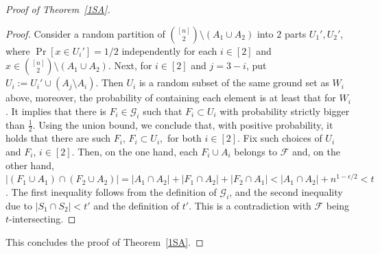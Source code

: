 \documentclass[10pt,a4paper]{amsart}
\newcommand{\ff}{\mathcal{F}}
\newcommand{\g}{\mathcal{G}}
\begin{document}
\begin{proof}[Proof of Theorem~\ref{1SA}]
\begin{proof}
  Consider a random partition of ${[n]\choose 2}\setminus (A_1\cup A_2)$ into $2$ parts $U_1',U_2'$, where $\Pr[x\in U_i']=1/2$ independently for each $i\in [2]$ and $x\in {[n]\choose 2}\setminus (A_1\cup A_2)$. Next, for $i\in[2]$ and $j=3-i$, put $U_i:= U_i'\cup (A_j\setminus A_i)$. Then  $U_i$ is a random subset of the same ground set as $W_i$ above, moreover, the probability of containing each element is at least that for $W_i$. It implies that there is $F_i \in \g_i$ such that $F_i\subset U_i$ with probability strictly bigger than $\frac 12$. Using the union bound, we conclude that, with positive probability, it holds that there are such $F_i$, $F_i\subset U_i,$ for both  $i \in[2]$. Fix such choices of $U_i$ and $F_i$, $i \in [2]$. Then, on the one hand, each $F_i\cup A_i$ belongs to $\ff$ and, on the other hand, $|(F_1\cup A_1)\cap (F_2\cup A_2)| =|A_1\cap A_2|+|F_1\cap A_2|+|F_2\cap A_1|< |A_1\cap A_2|+n^{1-\epsilon/2}<t$. The first inequality follows from the definition of $\g_i$, and the second inequality due to $|S_1\cap S_2|<t'$ and the definition of $t'$. This is a contradiction with $\ff$ being $t$-intersecting.
  \end{proof}
This concludes the proof of Theorem~\ref{1SA}.\end{proof}
\end{document}
